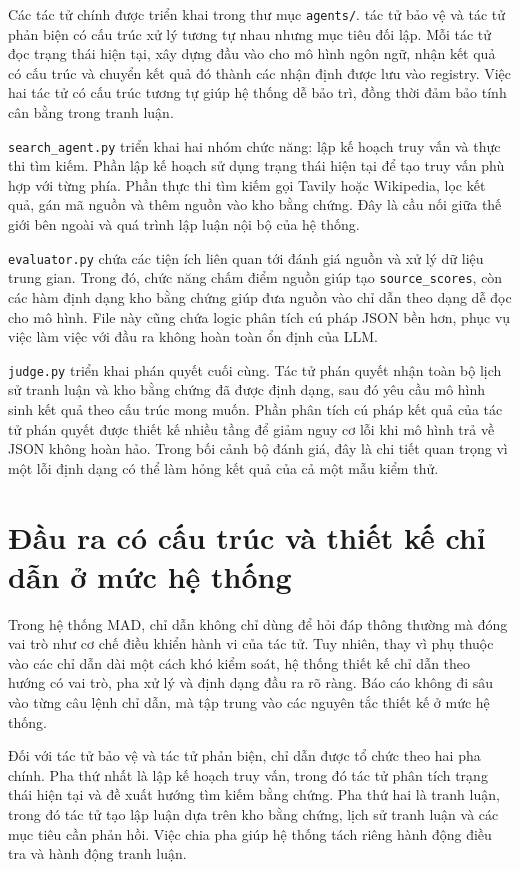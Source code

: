 ﻿\documentclass[oneside,a4paper,12pt]{extreport}
\begin{document}
Các tác tử chính được triển khai trong thư mục \texttt{agents/}. tác tử bảo vệ và tác tử phản biện có cấu trúc xử lý tương tự nhau nhưng mục tiêu đối lập. Mỗi tác tử đọc trạng thái hiện tại, xây dựng đầu vào cho mô hình ngôn ngữ, nhận kết quả có cấu trúc và chuyển kết quả đó thành các nhận định được lưu vào registry. Việc hai tác tử có cấu trúc tương tự giúp hệ thống dễ bảo trì, đồng thời đảm bảo tính cân bằng trong tranh luận.

\texttt{search\_agent.py} triển khai hai nhóm chức năng: lập kế hoạch truy vấn và thực thi tìm kiếm. Phần lập kế hoạch sử dụng trạng thái hiện tại để tạo truy vấn phù hợp với từng phía. Phần thực thi tìm kiếm gọi Tavily hoặc Wikipedia, lọc kết quả, gán mã nguồn và thêm nguồn vào kho bằng chứng. Đây là cầu nối giữa thế giới bên ngoài và quá trình lập luận nội bộ của hệ thống.

\texttt{evaluator.py} chứa các tiện ích liên quan tới đánh giá nguồn và xử lý dữ liệu trung gian. Trong đó, chức năng chấm điểm nguồn giúp tạo \texttt{source\_scores}, còn các hàm định dạng kho bằng chứng giúp đưa nguồn vào chỉ dẫn theo dạng dễ đọc cho mô hình. File này cũng chứa logic phân tích cú pháp JSON bền hơn, phục vụ việc làm việc với đầu ra không hoàn toàn ổn định của LLM.

\texttt{judge.py} triển khai phán quyết cuối cùng. Tác tử phán quyết nhận toàn bộ lịch sử tranh luận và kho bằng chứng đã được định dạng, sau đó yêu cầu mô hình sinh kết quả theo cấu trúc mong muốn. Phần phân tích cú pháp kết quả của tác tử phán quyết được thiết kế nhiều tầng để giảm nguy cơ lỗi khi mô hình trả về JSON không hoàn hảo. Trong bối cảnh bộ đánh giá, đây là chi tiết quan trọng vì một lỗi định dạng có thể làm hỏng kết quả của cả một mẫu kiểm thử.

\section{Đầu ra có cấu trúc và thiết kế chỉ dẫn ở mức hệ thống}

Trong hệ thống MAD, chỉ dẫn không chỉ dùng để hỏi đáp thông thường mà đóng vai trò như cơ chế điều khiển hành vi của tác tử. Tuy nhiên, thay vì phụ thuộc vào các chỉ dẫn dài một cách khó kiểm soát, hệ thống thiết kế chỉ dẫn theo hướng có vai trò, pha xử lý và định dạng đầu ra rõ ràng. Báo cáo không đi sâu vào từng câu lệnh chỉ dẫn, mà tập trung vào các nguyên tắc thiết kế ở mức hệ thống.

Đối với tác tử bảo vệ và tác tử phản biện, chỉ dẫn được tổ chức theo hai pha chính. Pha thứ nhất là lập kế hoạch truy vấn, trong đó tác tử phân tích trạng thái hiện tại và đề xuất hướng tìm kiếm bằng chứng. Pha thứ hai là tranh luận, trong đó tác tử tạo lập luận dựa trên kho bằng chứng, lịch sử tranh luận và các mục tiêu cần phản hồi. Việc chia pha giúp hệ thống tách riêng hành động điều tra và hành động tranh luận.
\end{document}
